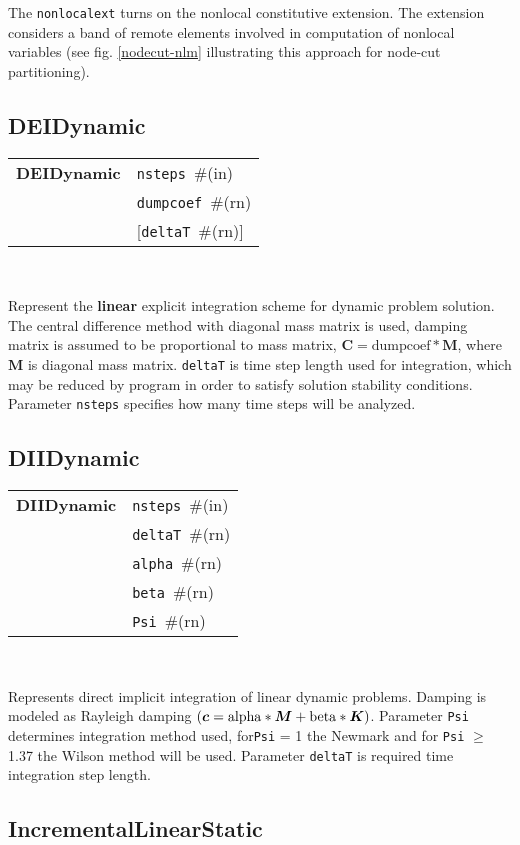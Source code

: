 \documentclass[a4paper]{report}
\newcommand{\mbf}[1]{\boldsymbol{#1}}
\newcommand{\param}[1]{\texttt{#1}} %
\newcommand{\optional}[1]{[#1]} %
\newcommand{\field}[2]{\param{#1}~\#{\tiny(#2)}} %
\newcommand{\optField}[2]{\optional{\field{#1}{#2}}}
\newcommand{\entKeywordInst}[1]{\textbf{#1}} %
\newcommand{\Pmode}[1]{{\sffamily #1}}
\newenvironment{record}[1][]{\begin{tabular}{|ll}}{\end{tabular}\\}
\newcommand{\recentry}[2]{{#1}&{#2}\\}
\newcounter{rcc}
\newenvironment{record}[1][\textwidth]{\setcounter{rcc}{0}\rowcolors{1}{lightgray}{lightgray}\tabularx{#1}{llR} \hline}
               {\endtabularx}
\newcommand{\recentry}[2]{\ifthenelse{\value{rcc}>0}{$\backslash$ \\}{\setcounter{rcc}{1}}{#1}&{#2}&}
\begin{document}
\noindent
\Pmode{
The \param{nonlocalext} turns on the nonlocal constitutive
extension. The extension considers a band of remote elements involved
in computation of nonlocal variables (see fig. \ref{nodecut-nlm} illustrating
this approach for node-cut partitioning).
}

\subsection{DEIDynamic}
\label{DEIDynamic}

\begin{record}
  \recentry{\entKeywordInst{DEIDynamic}}{\field{nsteps}{in}}
  \recentry{}{\field{dumpcoef}{rn}}
  \recentry{}{\optField{deltaT}{rn}}
\end{record}

Represent the \textbf{linear} explicit
integration scheme for dynamic problem solution. The central difference method with diagonal mass matrix is used,
damping matrix is assumed to be proportional to mass matrix, $\mbf{C} = \mathrm{dumpcoef} * \mbf{M}$, where
$\mbf{M}$ is diagonal mass matrix. \param{deltaT} is time step length used for
integration, which may be reduced by program in order to satisfy
solution stability conditions. Parameter \param{nsteps} specifies
how many time steps will be analyzed.

\subsection{DIIDynamic}
\label{DIIDynamic}

\begin{record}
  \recentry{\entKeywordInst{DIIDynamic}}{\field{nsteps}{in}}
  \recentry{}{\field{deltaT}{rn}}
  \recentry{}{\field{alpha}{rn}}
  \recentry{}{\field{beta}{rn}}
  \recentry{}{\field{Psi}{rn}}
\end{record}

Represents direct implicit integration of linear dynamic
problems. Damping is modeled as Rayleigh damping $(\mbf{c} =
\rm{alpha}*\mbf{M} + \rm{beta} * \mbf{K})$. Parameter \param{Psi} determines
integration method used, for\param{Psi} = 1 the Newmark and for \param{Psi} $\ge$ 1.37 the Wilson method
will be used. Parameter \param{deltaT} is required time integration
step length.

\subsection{IncrementalLinearStatic}
\label{IncrementalLinearStatic}
\end{document}
